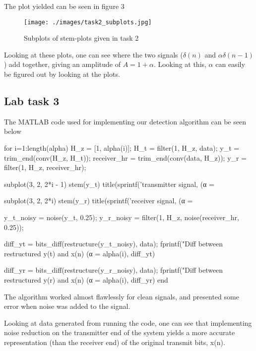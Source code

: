\documentclass[a4paper,11pt]{article}
\begin{document}
The plot yielded can be seen in figure 3
\begin{figure}[H]
    \hspace{-50pt}\texttt{[image: ./images/task2\_subplots.jpg]}
    \caption{Subplots of stem-plots given in task 2}
    \label{fig:my_label}
\end{figure}

Looking at these plots, one can see where the two signals ($\delta(n)$ and $\alpha\delta(n-1)$) add together, giving an amplitude of $A = 1+\alpha$. Looking at this, $\alpha$ can easily be figured out by looking at the plots.


\subsection{Lab task 3}
The MATLAB code used for implementing our detection algorithm can be seen below
\begin{ffcode}

for i=1:length(alpha)
    H_z = [1, alpha(i)];
    H_t = filter(1, H_z, data);
    y_t = trim_end(conv(H_z, H_t));
    receiver_hr = trim_end(conv(data, H_z));
    y_r = filter(1, H_z, receiver_hr);

    subplot(3, 2, 2*i - 1)
    stem(y_t)
    title(sprintf('transmitter signal, (α = %
    
    subplot(3, 2, 2*i)
    stem(y_r)
    title(sprintf('receiver signal, (α = %

    y_t_noisy = noise(y_t, 0.25);
    y_r_noisy = filter(1, H_z, noise(receiver_hr, 0.25));

    diff_yt = bits_diff(restructure(y_t_noisy), data);
    fprintf("Diff between restructured y(t) and x(n) (α = %
        alpha(i), diff_yt)

    diff_yr = bits_diff(restructure(y_r_noisy), data);
    fprintf("Diff between restructured y(r) and x(n) (α = %
        alpha(i), diff_yr)
end
\end{ffcode}

The algorithm worked almost flawlessly for clean signals, and presented some error when noise was added to the signal.

Looking at data generated from running the code, one can see that implementing noise reduction on the transmitter end of the system yields a more accurate representation (than the receiver end) of the original transmit bits, x(n). 
\end{document}
